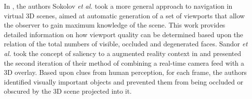 In \cite{sokolov2008virtual}, the authors Sokolov \textit{et al.} took a more general approach to navigation in virtual 3D scenes, aimed at automatic generation of a set of viewports that allow the observer to gain maximum knowledge of the scene. This work provides detailed information on how viewport quality can be determined based upon the relation of the total numbers of visible, occluded and degenerated faces.
Sandor \textit{et al.} took the concept of saliency to a augmented reality context in \cite{sandor2010augmented} and presented the second iteration of their method of combining a real-time camera feed with a 3D overlay. Based upon clues from human perception, for each frame, the authors identified visually important objects and prevented them from being occluded or obscured by the 3D scene projected into it.

